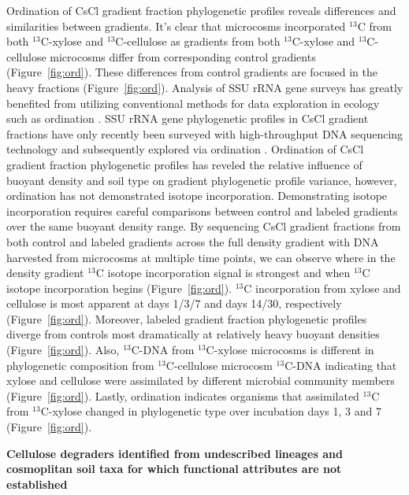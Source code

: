 Ordination of CsCl gradient fraction phylogenetic profiles reveals differences
and similarities between gradients. It's clear that microcosms incorporated
$^{13}$C from both $^{13}$C-xylose and $^{13}$C-cellulose as gradients from
both $^{13}$C-xylose and $^{13}$C-cellulose microcosms differ from
corresponding control gradients (Figure~\ref{fig:ord}). These differences from
control gradients are focused in the heavy fractions (Figure~\ref{fig:ord}).
Analysis of SSU rRNA gene surveys has
greatly benefited from utilizing conventional methods for data exploration
in ecology such as ordination \citep{Lozupone_2008}.  SSU rRNA gene
phylogenetic profiles in CsCl gradient fractions have only recently been
surveyed with high-throughput DNA sequencing technology and subsequently
explored via ordination \citep{Angel_2013, Verastegui_2014}. Ordination of CsCl
gradient fraction phylogenetic profiles has reveled the relative influence of
buoyant density and soil type on gradient phylogenetic profile variance, 
however, ordination has not demonstrated isotope incorporation.  Demonstrating
isotope incorporation requires careful comparisons between control and labeled
gradients over the same buoyant density range. By sequencing CsCl gradient
fractions from both control and labeled gradients across the full density
gradient with DNA harvested from microcosms at multiple time points, we can
observe where in the density gradient $^{13}$C isotope incorporation signal is
strongest and when $^{13}$C isotope incorporation begins (Figure~\ref{fig:ord}).
$^{13}$C incorporation from xylose and cellulose is most apparent at days 1/3/7
and days 14/30, respectively (Figure~\ref{fig:ord}). Moreover, labeled gradient
fraction phylogenetic profiles diverge from controls most dramatically at
relatively heavy buoyant densities (Figure~\ref{fig:ord}). Also, $^{13}$C-DNA from $^{13}$C-xylose microcosms is different in phylogenetic composition from $^{13}$C-cellulose microcosm $^{13}$C-DNA indicating that xylose and cellulose were assimilated by different microbial community members (Figure~\ref{fig:ord}). Lastly, ordination indicates
organisms that assimilated $^{13}$C from $^{13}$C-xylose changed in phylogenetic type over incubation days 1, 3 and 7 (Figure~\ref{fig:ord}).

\textbf{Cellulose degraders identified from undescribed lineages and
cosmoplitan soil taxa for which functional attributes are not established}

